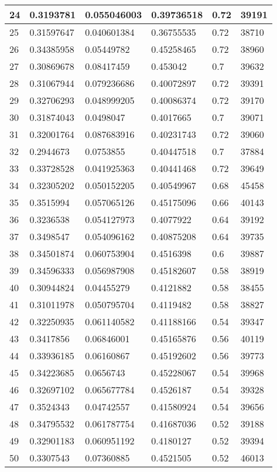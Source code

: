 \begin{longtable}{|l|l|l|l|l|l|}
24 & 0.3193781 & 0.055046003 & 0.39736518 & 0.72 & 39191 \\ \hline 
25 & 0.31597647 & 0.040601384 & 0.36755535 & 0.72 & 38710 \\ \hline 
26 & 0.34385958 & 0.05449782 & 0.45258465 & 0.72 & 38960 \\ \hline 
27 & 0.30869678 & 0.08417459 & 0.453042 & 0.7 & 39632 \\ \hline 
28 & 0.31067944 & 0.079236686 & 0.40072897 & 0.72 & 39391 \\ \hline 
29 & 0.32706293 & 0.048999205 & 0.40086374 & 0.72 & 39170 \\ \hline 
30 & 0.31874043 & 0.0498047 & 0.4017665 & 0.7 & 39071 \\ \hline 
31 & 0.32001764 & 0.087683916 & 0.40231743 & 0.72 & 39060 \\ \hline 
32 & 0.2944673 & 0.0753855 & 0.40447518 & 0.7 & 37884 \\ \hline 
33 & 0.33728528 & 0.041925363 & 0.40441468 & 0.72 & 39649 \\ \hline 
34 & 0.32305202 & 0.050152205 & 0.40549967 & 0.68 & 45458 \\ \hline 
35 & 0.3515994 & 0.057065126 & 0.45175096 & 0.66 & 40143 \\ \hline 
36 & 0.3236538 & 0.054127973 & 0.4077922 & 0.64 & 39192 \\ \hline 
37 & 0.3498547 & 0.054096162 & 0.40875208 & 0.64 & 39735 \\ \hline 
38 & 0.34501874 & 0.060753904 & 0.4516398 & 0.6 & 39887 \\ \hline 
39 & 0.34596333 & 0.056987908 & 0.45182607 & 0.58 & 38919 \\ \hline 
40 & 0.30944824 & 0.04455279 & 0.4121882 & 0.58 & 38455 \\ \hline 
41 & 0.31011978 & 0.050795704 & 0.4119482 & 0.58 & 38827 \\ \hline 
42 & 0.32250935 & 0.061140582 & 0.41188166 & 0.54 & 39347 \\ \hline 
43 & 0.3417856 & 0.06846001 & 0.45165876 & 0.56 & 40119 \\ \hline 
44 & 0.33936185 & 0.06160867 & 0.45192602 & 0.56 & 39773 \\ \hline 
45 & 0.34223685 & 0.0656743 & 0.45228067 & 0.54 & 39968 \\ \hline 
46 & 0.32697102 & 0.065677784 & 0.4526187 & 0.54 & 39328 \\ \hline 
47 & 0.3524343 & 0.04742557 & 0.41580924 & 0.54 & 39656 \\ \hline 
48 & 0.34795532 & 0.061787754 & 0.41687036 & 0.52 & 39188 \\ \hline 
49 & 0.32901183 & 0.060951192 & 0.4180127 & 0.52 & 39394 \\ \hline 
50 & 0.3307543 & 0.07360885 & 0.4521505 & 0.52 & 46013 \\ \hline 
\end{longtable}